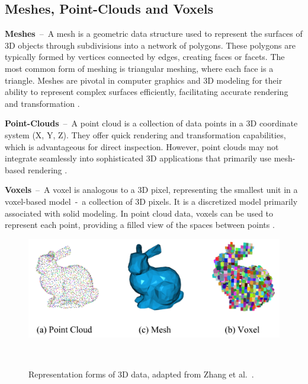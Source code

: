 \subsection{Meshes, Point-Clouds and Voxels}\label{MPCV}

\textbf{Meshes}~--~A mesh is a geometric data structure used to represent the surfaces of 3D objects through subdivisions into a network of polygons. These polygons are typically formed by vertices connected by edges, creating faces or facets. The most common form of meshing is triangular meshing, where each face is a triangle. Meshes are pivotal in computer graphics and 3D modeling for their ability to represent complex surfaces efficiently, facilitating accurate rendering and transformation \citep{lahav2020meshwalker, Zhang_2023}.

\textbf{Point-Clouds}~--~A point cloud is a collection of data points in a 3D coordinate system (X, Y, Z). They offer quick rendering and transformation capabilities, which is advantageous for direct inspection. However, point clouds may not integrate seamlessly into sophisticated 3D applications that primarily use mesh-based rendering \citep{voxels, Zhang_2023}.

\textbf{Voxels}~--~A voxel is analogous to a 3D pixel, representing the smallest unit in a voxel-based model~-~a collection of 3D pixels. It is a discretized model primarily associated with solid modeling. In point cloud data, voxels can be used to represent each point, providing a filled view of the spaces between points \citep{voxels, Zhang_2023}.

\begin{figure}[H]
    \centering
      \includegraphics[width=.8\columnwidth]{figures/mpcv.png}
      \caption{Representation forms of 3D data, adapted from Zhang et al.~\citep{Zhang_2023}.}~\label{fig:mpcv}
\end{figure}